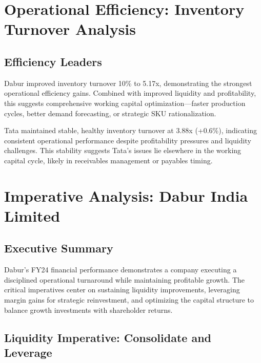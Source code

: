 \documentclass[12pt, a4paper]{report}
\begin{document}
\vspace{0.3cm}

\section{Operational Efficiency: Inventory Turnover Analysis}

\subsection{Efficiency Leaders}

Dabur improved inventory turnover 10\% to 5.17x, demonstrating the strongest operational efficiency gains. Combined with improved liquidity and profitability, this suggests comprehensive working capital optimization—faster production cycles, better demand forecasting, or strategic SKU rationalization.

Tata maintained stable, healthy inventory turnover at 3.88x (+0.6\%), indicating consistent operational performance despite profitability pressures and liquidity challenges. This stability suggests Tata's issues lie elsewhere in the working capital cycle, likely in receivables management or payables timing.

\newpage


\section{Imperative Analysis: Dabur India Limited}

\subsection{Executive Summary}

Dabur's FY24 financial performance demonstrates a company executing a disciplined operational turnaround while maintaining profitable growth. The critical imperatives center on sustaining liquidity improvements, leveraging margin gains for strategic reinvestment, and optimizing the capital structure to balance growth investments with shareholder returns.

\subsection{Liquidity Imperative: Consolidate and Leverage}
\end{document}
